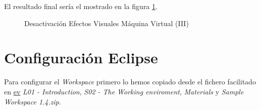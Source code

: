 \documentclass{scrartcl}
\begin{document}
El resultado final sería el mostrado en la figura \ref{fig:ConfVM06}.
\begin{figure}[H]
	
	\centering
	\caption{Desactivación Efectos Visuales Máquina Virtual (III)}
	\label{fig:ConfVM06}
	
\end{figure}

\section{Configuración Eclipse}
Para configurar el \textit{Workspace} primero lo hemos copiado desde el fichero facilitado en \href{htps://ev.us.es/}{ev} \textit{L01 - Introduction}, 
 \textit{S02 - The Working enviroment}, \textit{Materials} y \textit{Sample Workspace 1.4.zip}.
 
\end{document}
